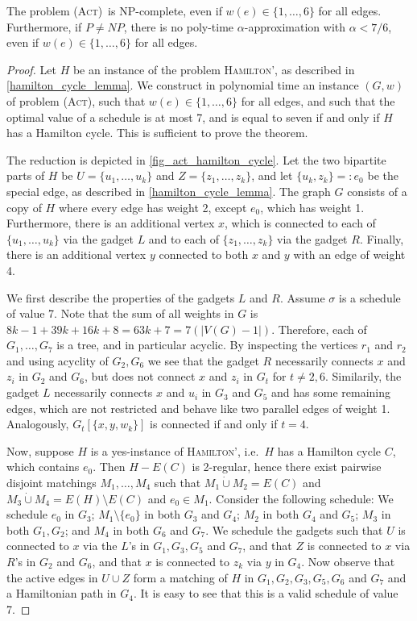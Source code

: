 \documentclass[runningheads]{llncs}
\numberwithin{equation}{section}
\newcommand{\set}[1]{\{ #1 \}}
\newcommand{\fromto}[2]{\set{#1, \ldots, #2}}
\newcommand{\dotunion}{\mathbin{\dot{\cup}}}
\newcommand{\act}{\textsc{(Act)}}
\begin{document}
\begin{theorem}
\label{corollary_act_no_approx}
The problem \act\ is NP-complete, even if $w(e) \in \fromto{1}{6}$ for all edges. Furthermore, if $P \neq NP$, there is no poly-time $\alpha$-approximation with $\alpha < 7/6$, even if $w(e) \in \fromto{1}{6}$ for all edges.
\end{theorem}
\begin{proof}
Let $H$ be an instance of the problem \textsc{Hamilton'}, as described in \cref{hamilton_cycle_lemma}. We construct in polynomial time an instance $(G, w)$ of problem \act, such that $w(e) \in \fromto{1}{6}$ for all edges, and such that the optimal value of a schedule is at most 7, and is equal to seven if and only if $H$ has a Hamilton cycle. This is sufficient to prove the theorem.

The reduction is depicted in \cref{fig_act_hamilton_cycle}. Let the two bipartite parts of $H$ be $U = \fromto{u_1}{u_k}$ and $Z = \fromto{z_1}{z_k}$, and let $\set{u_k, z_k} =: e_0$ be the special edge, as described in \cref{hamilton_cycle_lemma}. The graph $G$ consists of a copy of $H$ where every edge has weight 2, except $e_0$, which has weight 1. Furthermore, there is an additional vertex $x$, which is connected to each of $\fromto{u_1}{u_k}$ via the gadget $L$ and to each of $\fromto{z_1}{z_k}$ via the gadget $R$. Finally, there is an additional vertex $y$ connected to both $x$ and $y$ with an edge of weight 4.

We first describe the properties of the gadgets $L$ and $R$. Assume $\sigma$ is a schedule of value 7. Note that the sum of all weights in $G$ is $8k - 1 + 39k + 16k + 8 = 63k + 7 = 7(|V(G) - 1|)$. Therefore, each of $G_{1}, \ldots, G_{7}$ is a tree, and in particular acyclic. By inspecting the vertices $r_1$ and $r_2$ and using acyclity of $G_2, G_6$ we see that the gadget $R$ necessarily connects $x$ and $z_i$ in $G_2$ and $G_6$, but does not connect $x$ and $z_i$ in $G_t$ for $t \neq 2,6$. Similarily, the gadget $L$ necessarily connects $x$ and $u_i$ in $G_3$ and $G_5$ and has some remaining edges, which are not restricted and behave like two parallel edges of weight 1. Analogously, $G_{t}[\set{x, y, w_k}]$ is connected if and only if $t = 4$.

Now, suppose $H$ is a yes-instance of \textsc{Hamilton'}, i.e.\ $H$ has a Hamilton cycle $C$, which contains $e_0$. Then $H - E(C)$ is 2-regular, hence there exist pairwise disjoint matchings $M_1, \ldots, M_4$ such that $M_1 \dotunion M_2 = E(C)$ and $M_3 \dotunion M_4 = E(H) \setminus E(C)$ and $e_0 \in M_1$. Consider the following schedule: We schedule $e_0$ in $G_3$; $M_1 \setminus \set{e_0}$ in both $G_3$ and $G_4$; $M_2$ in both $G_4$ and $G_5$; $M_3$ in both $G_1, G_2$; and $M_4$ in both $G_6$ and $G_7$. We schedule the gadgets such that $U$ is connected to $x$ via the $L$'s in $G_1, G_3, G_5$ and $G_7$, and that $Z$ is connected to $x$ via $R$'s in $G_2$ and $G_6$, and that $x$ is connected to $z_k$ via $y$ in $G_4$. Now observe that the active edges in $U \cup Z$ form a matching of $H$ in $G_1, G_2, G_3, G_5, G_6$ and $G_7$ and a Hamiltonian path in $G_4$. It is easy to see that this is a valid schedule of value 7. 


\end{proof}
\end{document}
